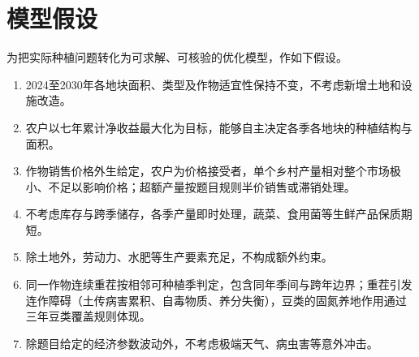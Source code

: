 
\section{模型假设}

为把实际种植问题转化为可求解、可核验的优化模型，作如下假设。

\begin{enumerate}[itemindent=2em, label=\textbf{假设\arabic*.}]
  \item 2024至2030年各地块面积、类型及作物适宜性保持不变，不考虑新增土地和设施改造。
  \item 农户以七年累计净收益最大化为目标，能够自主决定各季各地块的种植结构与面积。
  \item 作物销售价格外生给定，农户为价格接受者，单个乡村产量相对整个市场极小、不足以影响价格；超额产量按题目规则半价销售或滞销处理。
  \item 不考虑库存与跨季储存，各季产量即时处理，蔬菜、食用菌等生鲜产品保质期短。
  \item 除土地外，劳动力、水肥等生产要素充足，不构成额外约束。
  \item 同一作物连续重茬按相邻可种植季判定，包含同年季间与跨年边界；重茬引发连作障碍（土传病害累积、自毒物质、养分失衡），豆类的固氮养地作用通过三年豆类覆盖规则体现。
  \item 除题目给定的经济参数波动外，不考虑极端天气、病虫害等意外冲击。
\end{enumerate}
